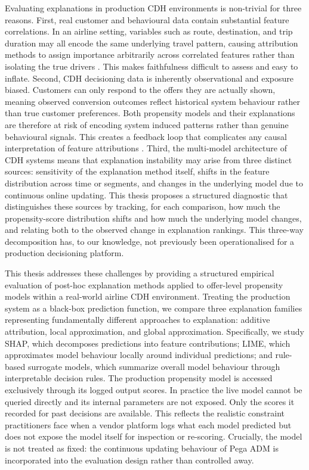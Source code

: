 \documentclass[oneside]{memoir} %
\begin{document}
Evaluating explanations in production CDH environments is non-trivial for three reasons. First, real customer and behavioural data contain substantial feature correlations. In an airline setting, variables such as route, destination, and trip duration may all encode the same underlying travel pattern, causing attribution methods to assign importance arbitrarily across correlated features rather than isolating the true drivers \parencite{lundberg_unified_2017}. This makes faithfulness difficult to assess and easy to inflate. Second, CDH decisioning data is inherently observational and exposure biased. Customers can only respond to the offers they are actually shown, meaning observed conversion outcomes reflect historical system behaviour rather than true customer preferences. Both propensity models and their explanations are therefore at risk of encoding system induced patterns rather than genuine behavioural signals. This creates a feedback loop that complicates any causal interpretation of feature attributions \parencite{lundberg_be_2018, schnabel_recommendations_2016}. Third, the multi-model architecture of CDH systems means that explanation instability may arise from three distinct sources: sensitivity of the explanation method itself, shifts in the feature distribution across time or segments, and changes in the underlying model due to continuous online updating. This thesis proposes a structured diagnostic that distinguishes these sources by tracking, for each comparison, how much the propensity-score distribution shifts and how much the underlying model changes, and relating both to the observed change in explanation rankings. This three-way decomposition has, to our knowledge, not previously been operationalised for a production decisioning platform.

This thesis addresses these challenges by providing a structured empirical evaluation of post-hoc explanation methods applied to offer-level propensity models within a real-world airline CDH environment. Treating the production system as a black-box prediction function, we compare three explanation families representing fundamentally different approaches to explanation: additive attribution, local approximation, and global approximation. Specifically, we study SHAP, which decomposes predictions into feature contributions; LIME, which approximates model behaviour locally around individual predictions; and rule-based surrogate models, which summarize overall model behaviour through interpretable decision rules. The production propensity model is accessed exclusively through its logged output scores. In practice the live model cannot be queried directly and its internal parameters are not exposed. Only the scores it recorded for past decisions are available. This reflects the realistic constraint practitioners face when a vendor platform logs what each model predicted but does not expose the model itself for inspection or re-scoring. Crucially, the model is not treated as fixed: the continuous updating behaviour of Pega ADM is incorporated into the evaluation design rather than controlled away.
\end{document}
